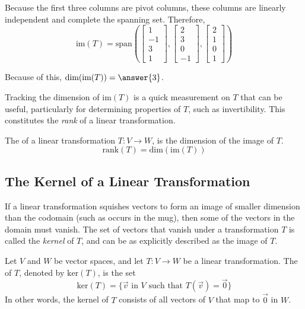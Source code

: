\documentclass{ximera}
\begin{document}
\begin{example}
\begin{explanation}
Because the first three columns are pivot columns, these columns are linearly independent and complete the spanning set.  Therefore,
$$\mbox{im}(T)=\mbox{span}\left(\begin{bmatrix}1\\-1\\3\\1\end{bmatrix}, \begin{bmatrix}2\\3\\0\\-1\end{bmatrix}, \begin{bmatrix}2\\1\\0\\1\end{bmatrix}\right)$$

Because of this, $\mbox{dim}(\mbox{im}(T))=\answer{3}$.
\end{explanation}
\end{example}
 
Tracking the dimension of $\mbox{im}(T)$ is a quick measurement on $T$ that can be useful, particularly for determining properties of $T$, such as invertibility. This constitutes the \emph{rank} of a linear transformation.
 
\begin{definition}\label{def:rankofT}
The  of a linear transformation $T:V\rightarrow W$, is the dimension of the image of $T$.
$$\mbox{rank}(T)=\mbox{dim}(\mbox{im}(T))$$
\end{definition}

 
\subsection*{The Kernel of a Linear Transformation}

If a linear transformation squishes vectors to form an image of smaller dimension than the codomain (such as occurs in the mug), then some of the vectors in the domain must vanish. The set of vectors that vanish under a transformation $T$ is called the \emph{kernel} of $T$, and can be as explicitly described as the image of $T$.
 
\begin{definition}\label{def:kernel}
Let $V$ and $W$ be vector spaces, and let $T:V\rightarrow W$ be a linear transformation.  The  of $T$, denoted by $\mbox{ker}(T)$, is the set
$$\mbox{ker}(T)=\{\vec{v}\text{ in }V\text{ such that }T(\vec{v})=\vec{0}\}$$
In other words, the kernel of $T$ consists of all vectors of $V$ that map to $\vec{0}$ in $W$.
\end{definition}
\end{document}
